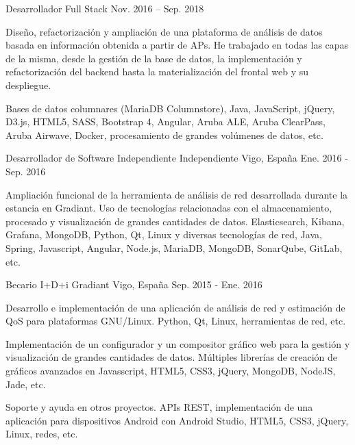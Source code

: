 \begin{cventries}
  \cventry
    {Desarrollador Full Stack}
    {}
    {}
    {Nov. 2016 – Sep. 2018}
    {
      \begin{cvitems}
        \item {Diseño, refactorización y ampliación de una plataforma de análisis de datos basada en información obtenida a partir de APs. He trabajado en todas las capas de la misma, desde la gestión de la base de datos, la implementación y refactorización del backend hasta la materialización del frontal web y su despliegue.}
        \item {Bases de datos columnares (MariaDB Columnstore), Java, JavaScript, jQuery, D3.js, HTML5, SASS, Bootstrap 4, Angular, Aruba ALE, Aruba ClearPass, Aruba Airwave, Docker, procesamiento de grandes volúmenes de datos, etc.}
      \end{cvitems}
    }

  \cventry
    {Desarrollador de Software Independiente}
    {Independiente}
    {Vigo, España}
    {Ene. 2016 - Sep. 2016}
    {
      \begin{cvitems}
        \item {Ampliación funcional de la herramienta de análisis de red desarrollada durante la estancia en Gradiant. Uso de tecnologías relacionadas con el almacenamiento, procesado y visualización de grandes cantidades de datos. Elasticsearch, Kibana, Grafana, MongoDB, Python, Qt, Linux y diversas tecnologías de red, Java, Spring, Javascript, Angular, Node.js, MariaDB, MongoDB, SonarQube, GitLab, etc.}
      \end{cvitems}
    }

  \cventry
    {Becario I+D+i}
    {Gradiant}
    {Vigo, España}
    {Sep. 2015 - Ene. 2016}
    {
      \begin{cvitems}
        \item {Desarrollo e implementación de una aplicación de análisis de red y estimación de QoS para plataformas GNU/Linux. Python, Qt, Linux, herramientas de red, etc.}
        \item {Implementación de un configurador y un compositor gráfico web para la gestión y visualización de grandes cantidades de datos. Múltiples librerías de creación de gráficos avanzados en Javasscript, HTML5, CSS3, jQuery, MongoDB, NodeJS, Jade, etc.}
        \item {Soporte y ayuda en otros proyectos. APIs REST, implementación de una aplicación para dispositivos Android con Android Studio, HTML5, CSS3, jQuery, Linux, redes, etc.}
      \end{cvitems}
    }
\end{cventries}
